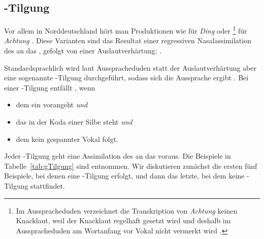 \subsection{-Tilgung}\label{sec:gTilgung}

Vor allem in Norddeutschland hört man Produktionen wie \textipa{[dINk]} für \textit{Ding}  oder \footnote{Im Ausspracheduden verzeichnet die Transkription von \textit{Achtung} keinen Knacklaut, weil der Knacklaut regelhaft gesetzt wird und deshalb im Ausspracheduden am Wortanfang vor Vokal nicht vermerkt wird \citep[14]{DudenAussprache2023}.} für \textit{Achtung} \citep[70]{DudenAussprache2023}. Diese Varianten sind das Resultat einer regressiven Nasalassimilation des  an das , gefolgt von einer Auslautverhärtung:  \rightarrow \textipa{[dINg]} \rightarrow \textipa{[dINk]}.

Standardsprachlich wird laut Ausspracheduden statt der Auslautverhärtung aber eine sogenannte -Tilgung durchgeführt, sodass sich die Aussprache \textipa{[dIN]} ergibt \citep[321]{DudenAussprache2023}. Bei einer -Tilgung entfällt , wenn 
\begin{itemize}
    \item dem  ein  vorangeht \textit{und}
    \item das  in der Koda einer Silbe steht \textit{und}
    \item dem  kein gespannter Vokal folgt.
\end{itemize}


Jeder -Tilgung geht eine Assimilation des  an das  voraus. Die Beispiele in Tabelle~\ref{tab:gTilgung} sind \citet[818--819, 823]{Hall1989} entnommen. Wir diskutieren zunächst die ersten fünf Beispiele, bei denen eine -Tilgung erfolgt, und dann das letzte, bei dem keine -Tilgung stattfindet.


